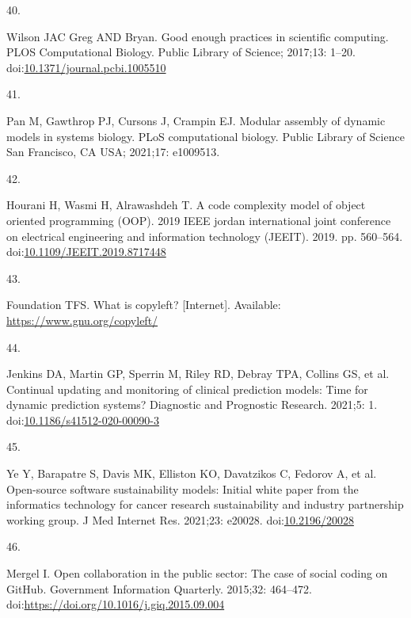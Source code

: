 \documentclass[
]{article}
\newlength{\cslhangindent}
\newlength{\csllabelwidth}
\newlength{\cslentryspacingunit} %
\newenvironment{CSLReferences}[2] %
 {%
  \setlength{\parindent}{0pt}
  \ifodd #1
  \let\oldpar\par
  \def\par{\hangindent=\cslhangindent\oldpar}
  \fi
  \setlength{\parskip}{#2\cslentryspacingunit}
 }%
 {}
\newcommand{\CSLLeftMargin}[1]{\parbox[t]{\csllabelwidth}{#1}}
\newcommand{\CSLRightInline}[1]{\parbox[t]{\linewidth - \csllabelwidth}{#1}\break}
\begin{document}
\begin{CSLReferences}{0}{0}
\leavevmode{}%
\CSLLeftMargin{40. }%
\CSLRightInline{Wilson JAC Greg AND Bryan. Good enough practices in scientific computing. PLOS Computational Biology. Public Library of Science; 2017;13: 1--20. doi:\href{https://doi.org/10.1371/journal.pcbi.1005510}{10.1371/journal.pcbi.1005510}}

\leavevmode{}%
\CSLLeftMargin{41. }%
\CSLRightInline{Pan M, Gawthrop PJ, Cursons J, Crampin EJ. Modular assembly of dynamic models in systems biology. PLoS computational biology. Public Library of Science San Francisco, CA USA; 2021;17: e1009513. }

\leavevmode{}%
\CSLLeftMargin{42. }%
\CSLRightInline{Hourani H, Wasmi H, Alrawashdeh T. A code complexity model of object oriented programming (OOP). 2019 IEEE jordan international joint conference on electrical engineering and information technology (JEEIT). 2019. pp. 560--564. doi:\href{https://doi.org/10.1109/JEEIT.2019.8717448}{10.1109/JEEIT.2019.8717448}}

\leavevmode{}%
\CSLLeftMargin{43. }%
\CSLRightInline{Foundation TFS. What is copyleft? {[}Internet{]}. Available: \url{https://www.gnu.org/copyleft/}}

\leavevmode{}%
\CSLLeftMargin{44. }%
\CSLRightInline{Jenkins DA, Martin GP, Sperrin M, Riley RD, Debray TPA, Collins GS, et al. Continual updating and monitoring of clinical prediction models: Time for dynamic prediction systems? Diagnostic and Prognostic Research. 2021;5: 1. doi:\href{https://doi.org/10.1186/s41512-020-00090-3}{10.1186/s41512-020-00090-3}}

\leavevmode{}%
\CSLLeftMargin{45. }%
\CSLRightInline{Ye Y, Barapatre S, Davis MK, Elliston KO, Davatzikos C, Fedorov A, et al. Open-source software sustainability models: Initial white paper from the informatics technology for cancer research sustainability and industry partnership working group. J Med Internet Res. 2021;23: e20028. doi:\href{https://doi.org/10.2196/20028}{10.2196/20028}}

\leavevmode{}%
\CSLLeftMargin{46. }%
\CSLRightInline{Mergel I. Open collaboration in the public sector: The case of social coding on GitHub. Government Information Quarterly. 2015;32: 464--472. doi:\url{https://doi.org/10.1016/j.giq.2015.09.004}}


\end{CSLReferences}
\end{document}
